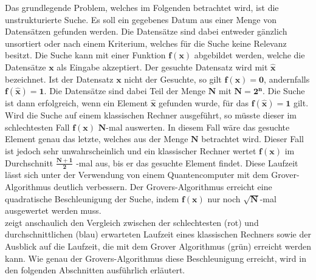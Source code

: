 Das grundlegende Problem, welches im Folgenden betrachtet wird, ist die unstrukturierte Suche. 
Es soll ein gegebenes Datum aus einer Menge von Datensätzen gefunden werden. 
Die Datensätze sind dabei entweder gänzlich unsortiert oder nach einem Kriterium, welches für die Suche keine Relevanz besitzt. 
Die Suche kann mit einer Funktion $\mathbf{f(x)}$ abgebildet werden, welche die Datensätze $\mathbf{x}$ als Eingabe akzeptiert. 
Der gesuchte Datensatz wird mit $\mathbf{\hat x}$ bezeichnet. Ist der Datensatz $\mathbf{x}$ nicht der Gesuchte, so gilt $\mathbf{f(x) = 0}$, andernfalls $\mathbf{f(\hat x) = 1}$. 
Die Datensätze sind dabei Teil der Menge $\mathbf{N}$ mit $\mathbf{N = 2^n}$. Die Suche ist dann erfolgreich, wenn ein Element $\mathbf{\hat x}$ gefunden wurde, für das $\mathbf{f(\hat x) = 1}$ gilt.
\newline
\\
Wird die Suche auf einem klassischen Rechner ausgeführt, so müsste dieser im schlechtesten Fall $\mathbf{f(x)}$ $\mathbf{N}$-mal auswerten. 
In diesem Fall wäre das gesuchte Element genau das letzte, welches aus der Menge $\mathbf{N}$ betrachtet wird. 
Dieser Fall ist jedoch sehr unwahrscheinlich und ein klassischer Rechner wertet $\mathbf{f(x)}$ im Durchschnitt $\mathbf{\frac{N+1}{2}}$ -mal aus, bis er das gesuchte Element findet.
Diese Laufzeit lässt sich unter der Verwendung von einem Quantencomputer mit dem Grover-Algorithmus deutlich verbessern. 
Der Grovers-Algorithmus erreicht eine quadratische Beschleunigung der Suche, indem $\mathbf{f(x)}$ nur noch $\mathbf{\sqrt{N}}$-mal ausgewertet werden muss. 
\\
 zeigt anschaulich den Vergleich zwischen der schlechtesten (rot) und durchschnittlichen (blau) erwarteten Laufzeit eines klassischen Rechners sowie der Ausblick auf die Laufzeit, die mit dem Grover Algorithmus (grün) erreicht werden kann. Wie genau der Grovers-Algorithmus diese Beschleunigung erreicht, wird in den folgenden Abschnitten ausführlich erläutert.

